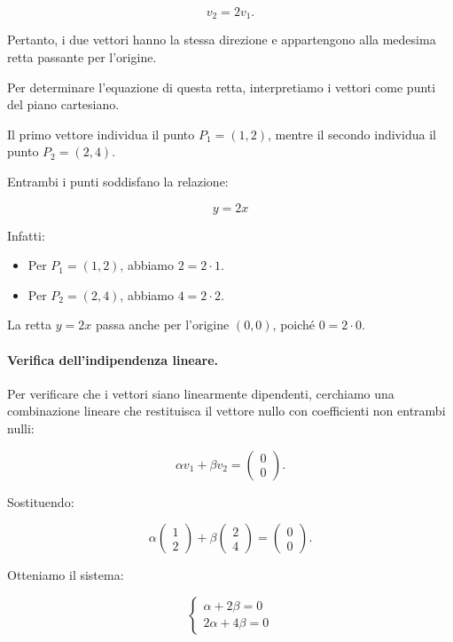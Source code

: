 \[
v_2=2v_1.
\]

Pertanto, i due vettori hanno la stessa direzione e appartengono alla medesima retta passante per l'origine.

Per determinare l'equazione di questa retta, interpretiamo i vettori come punti del piano cartesiano.

Il primo vettore individua il punto \(P_1=(1,2)\), mentre il secondo individua il punto \(P_2=(2,4)\).

Entrambi i punti soddisfano la relazione:

\[
\boxed{y=2x}
\]

Infatti:
\begin{itemize}
    \item Per \(P_1=(1,2)\), abbiamo \(2=2\cdot 1\).
    \item Per \(P_2=(2,4)\), abbiamo \(4=2\cdot 2\).
\end{itemize}

La retta \(y=2x\) passa anche per l'origine \((0,0)\), poiché \(0=2\cdot 0\).

\paragraph{Verifica dell'indipendenza lineare.}

Per verificare che i vettori siano linearmente dipendenti, cerchiamo una combinazione lineare che restituisca il vettore nullo con coefficienti non entrambi nulli:

\[
\alpha v_1+\beta v_2=
\begin{pmatrix}
0\\
0
\end{pmatrix}.
\]

Sostituendo:

\[
\alpha
\begin{pmatrix}
1\\
2
\end{pmatrix}
+
\beta
\begin{pmatrix}
2\\
4
\end{pmatrix}
=
\begin{pmatrix}
0\\
0
\end{pmatrix}.
\]

Otteniamo il sistema:

\[
\begin{cases}
\alpha+2\beta=0\\
2\alpha+4\beta=0
\end{cases}
\]


